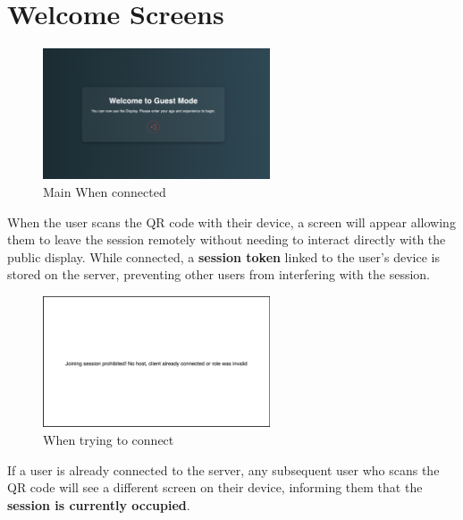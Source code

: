 \section{Welcome Screens}

\begin{figure}[H]
    \centering
     \includegraphics[width=0.6\textwidth]{images/WelcomeScreen.png}
     \caption{Main When connected}
\end{figure}
When the user scans the QR code with their device, a screen will appear allowing them to leave the 
session remotely without needing to interact directly with the public display. While connected, 
a \textbf{session token} linked to the user's device is stored on the server, preventing other 
users from interfering with the session.

\begin{figure}[H]
    \centering
    \includegraphics[width=0.6\textwidth]{images/WelcomeScreenInvalid.png}
    \caption{When trying to connect}
\end{figure}
If a user is already connected to the server, any subsequent user who scans the QR code will see 
a different screen on their device, informing them that the \textbf{session is currently occupied}.